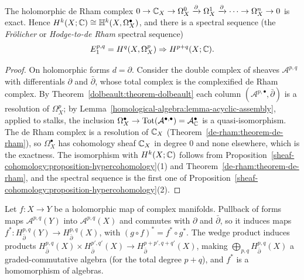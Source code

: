 \begin{theorem}\label{dolbeault:theorem-holomorphic-de-rham}
The holomorphic de Rham complex $0 \to \mathbb{C}_X \to \Omega^0_X \xrightarrow{\partial} \Omega^1_X \xrightarrow{\partial} \cdots \to \Omega^n_X \to 0$ is exact. Hence
$H^k(X; \mathbb{C}) \cong \mathbb{H}^k(X, \Omega^\bullet_X)$, and there is a spectral sequence (the \emph{Fr\"olicher} or \emph{Hodge-to-de Rham} spectral sequence)
\[
E_1^{p,q} = H^q(X, \Omega^p_X) \Rightarrow H^{p+q}(X; \mathbb{C}).
\]
\end{theorem}

\begin{proof}
On holomorphic forms $d = \partial$. Consider the double complex of sheaves $\mathcal{A}^{p,q}$ with differentials $\partial$ and $\bar\partial$, whose total complex is the complexified de Rham complex. By
Theorem~\ref{dolbeault:theorem-dolbeault} each column $(\mathcal{A}^{p,\bullet}, \bar\partial)$ is a resolution of $\Omega^p_X$; by Lemma~\ref{homological-algebra:lemma-acyclic-assembly}, applied to stalks, the
inclusion $\Omega^\bullet_X \to \mathrm{Tot}(\mathcal{A}^{\bullet,\bullet}) = \mathcal{A}^\bullet_{\mathbb{C}}$ is a quasi-isomorphism. The de Rham complex is a resolution of $\mathbb{C}_X$
(Theorem~\ref{de-rham:theorem-de-rham}), so $\Omega^\bullet_X$ has cohomology sheaf $\mathbb{C}_X$ in degree $0$ and none elsewhere, which is the exactness. The isomorphism with $H^k(X; \mathbb{C})$ follows from
Proposition~\ref{sheaf-cohomology:proposition-hypercohomology}(1) and Theorem~\ref{de-rham:theorem-de-rham}, and the spectral sequence is the first one of
Proposition~\ref{sheaf-cohomology:proposition-hypercohomology}(2).
\end{proof}

\begin{proposition}\label{dolbeault:proposition-functoriality}
Let $f \colon X \to Y$ be a holomorphic map of complex manifolds. Pullback of forms maps $\mathcal{A}^{p,q}(Y)$ into $\mathcal{A}^{p,q}(X)$ and commutes with $\partial$ and $\bar\partial$, so it induces
maps $f^* \colon H^{p,q}_{\bar\partial}(Y) \to H^{p,q}_{\bar\partial}(X)$, with $(g \circ f)^* = f^* \circ g^*$. The wedge product induces products
$H^{p,q}_{\bar\partial}(X) \times H^{p',q'}_{\bar\partial}(X) \to H^{p+p',q+q'}_{\bar\partial}(X)$, making $\bigoplus_{p,q}H^{p,q}_{\bar\partial}(X)$ a graded-commutative algebra (for the total degree $p + q$), and
$f^*$ is a homomorphism of algebras.
\end{proposition}

